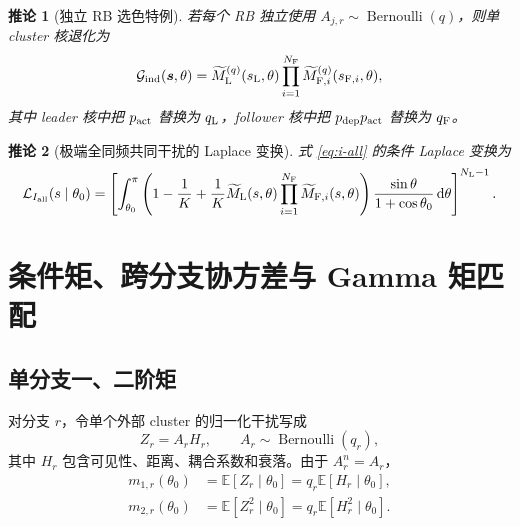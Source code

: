 \documentclass[UTF8,a4paper,11pt]{ctexart}
\newtheorem{corollary}{推论}[section]
\newcommand{\E}{\mathbb E}
\newcommand{\dd}{\,\mathrm d}
\newcommand{\NL}{N_{\mathrm L}}
\newcommand{\NF}{N_{\mathrm F}}
\newcommand{\Lcal}{\mathcal L}
\newcommand{\Gcal}{\mathcal G}
\newcommand{\svec}{\bm s}
\begin{document}
\begin{corollary}[独立 RB 选色特例]
若每个 RB 独立使用 $A_{j,r}\sim\operatorname{Bernoulli}(q)$，则单 cluster 核退化为
\begin{equation}
 \Gcal_{\rm ind}(\svec,\theta)
 =
 \widetilde M_{\rm L}^{(q)}(s_{\rm L},\theta)
 \prod_{i=1}^{\NF}
 \widetilde M_{{\rm F},i}^{(q)}(s_{{\rm F},i},\theta),
\end{equation}
其中 leader 核中把 $p_{\rm act}$ 替换为 $q_{\rm L}$，follower 核中把
$p_{\rm dep}p_{\rm act}$ 替换为 $q_{\rm F}$。
\end{corollary}

\begin{corollary}[极端全同频共同干扰的 Laplace 变换]
式 \eqref{eq:i-all} 的条件 Laplace 变换为
\begin{equation}
 \Lcal_{I_{\rm all}}(s\mid\theta_0)
 =
 \left[
 \int_{\theta_0}^{\pi}
 \left(
 1-\frac1K+\frac1K
 \widetilde M_{\rm L}(s,\theta)
 \prod_{i=1}^{\NF}\widetilde M_{{\rm F},i}(s,\theta)
 \right)
 \frac{\sin\theta}{1+\cos\theta_0}\dd\theta
 \right]^{\NL-1}.
 \label{eq:common-lt}
\end{equation}
\end{corollary}

\section{条件矩、跨分支协方差与 Gamma 矩匹配}

\subsection{单分支一、二阶矩}

对分支 $r$，令单个外部 cluster 的归一化干扰写成
\begin{equation}
 Z_r=A_rH_r,
 \qquad A_r\sim\operatorname{Bernoulli}(q_r),
 \label{eq:z-ah}
\end{equation}
其中 $H_r$ 包含可见性、距离、耦合系数和衰落。由于 $A_r^n=A_r$，
\begin{align}
 m_{1,r}(\theta_0)
 &=\E[Z_r\mid\theta_0]
 =q_r\E[H_r\mid\theta_0],\label{eq:m1-general}\\
 m_{2,r}(\theta_0)
 &=\E[Z_r^2\mid\theta_0]
 =q_r\E[H_r^2\mid\theta_0].
 \label{eq:m2-general}
\end{align}
\end{document}
